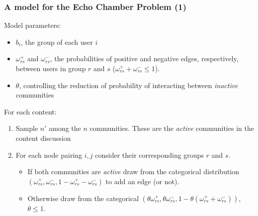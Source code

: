 \documentclass{beamer}
\begin{document}
\begin{frame}[c]
	\frametitle{A model for the Echo Chamber Problem (1)}
	Model parameters:
	\begin{itemize}
		\item $b_{i} $, the group of each user $i$
		\item $\omega ^{+} _{rs} $ and $\omega ^{-} _{rs} $, the probabilities
		      of positive and negative edges, respectively, between users in
		      group $r$ and $s$ ($\omega ^{+} _{rs} + \omega ^{-} _{rs} \leq 1$).
		\item $\theta$, controlling the reduction of probability of interacting
		      between \emph{inactive} communities
	\end{itemize}

	For each content:
	\begin{enumerate}
		\item Sample $n'$ among the $n$ communities. These are the
		      \emph{active} communities in the content discussion
		\item For each node pairing $i, j$ consider their corresponding groups $r$ and
		      $s$.
		      \begin{itemize}
			      \item If both communities are \emph{active} draw from the
			            categorical distribution $(\omega _{rs} ^{+}, \omega
				            _{rs} ^{-}, 1 - \omega _{rs} ^{+} - \omega _{rs} ^{-}) $ to add an edge (or
			            not).
			      \item Otherwise draw from the categorical $(\theta \omega _{rs} ^{+},
				            \theta \omega
				            _{rs} ^{-}, 1 - \theta (\omega _{rs} ^{+} + \omega _{rs}
				            ^{-}))$, $\theta \leq 1$.
		      \end{itemize}

	\end{enumerate}

\end{frame}
\end{document}
